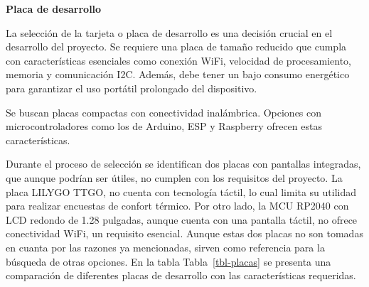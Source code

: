\documentclass[
  letterpaper,
  DIV=11,
  numbers=noendperiod]{scrreport}
\begin{document}
\textbf{Placa de desarrollo}

La selección de la tarjeta o placa de desarrollo es una decisión crucial
en el desarrollo del proyecto. Se requiere una placa de tamaño reducido
que cumpla con características esenciales como conexión WiFi, velocidad
de procesamiento, memoria y comunicación I2C. Además, debe tener un bajo
consumo energético para garantizar el uso portátil prolongado del
dispositivo.

Se buscan placas compactas con conectividad inalámbrica. Opciones con
microcontroladores como los de Arduino, ESP y Raspberry ofrecen estas
características.

Durante el proceso de selección se identifican dos placas con pantallas
integradas, que aunque podrían ser útiles, no cumplen con los requisitos
del proyecto. La placa LILYGO TTGO, no cuenta con tecnología táctil, lo
cual limita su utilidad para realizar encuestas de confort térmico. Por
otro lado, la MCU RP2040 con LCD redondo de 1.28 pulgadas, aunque cuenta
con una pantalla táctil, no ofrece conectividad WiFi, un requisito
esencial. Aunque estas dos placas no son tomadas en cuanta por las
razones ya mencionadas, sirven como referencia para la búsqueda de otras
opciones. En la tabla Tabla~\ref{tbl-placas} se presenta una comparación
de diferentes placas de desarrollo con las características requeridas.
\end{document}
